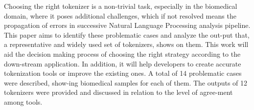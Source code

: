 Choosing the right tokenizer is a non-trivial task, especially in the biomedical domain, where it poses additional challenges, which if not resolved means the propagation of errors in successive Natural Language Processing analysis pipeline. This paper aims to identify these problematic cases and analyze the out-put that, a representative and widely used set of tokenizers, shows on them. This work will aid the decision making process of choosing the right strategy according to the down-stream application. In addition, it will help developers to create accurate tokenization tools or improve the existing ones. A total of 14 problematic cases were described, show-ing biomedical samples for each of them. The outputs of 12 tokenizers were provided and discussed in relation to the level of agree-ment among tools.
